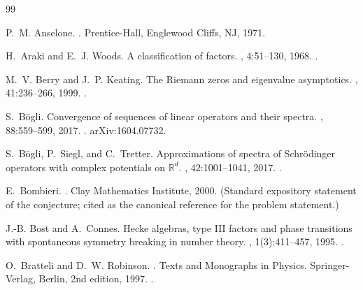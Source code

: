 %

\begin{thebibliography}{99}


P.~M. Anselone.
.
\newblock Prentice-Hall, Englewood Cliffs, NJ, 1971.

H.~Araki and E.~J. Woods.
\newblock A classification of factors.
, 4:51--130, 1968.
\newblock {}.


M.~V. Berry and J.~P. Keating.
\newblock The {R}iemann zeros and eigenvalue asymptotics.
, 41:236--266, 1999.
\newblock {}.

S.~B{\"o}gli.
\newblock Convergence of sequences of linear operators and their spectra.
, 88:559--599, 2017.
\newblock {}.
\newblock arXiv:1604.07732.

S.~B{\"o}gli, P.~Siegl, and C.~Tretter.
\newblock Approximations of spectra of {S}chr{\"o}dinger operators with complex
  potentials on $\mathbb{R}^d$.
, 42:1001--1041, 2017.
\newblock {}.

E.~Bombieri.
.
\newblock Clay Mathematics Institute, 2000.
\newblock (Standard expository statement of the conjecture; cited as the
  canonical reference for the problem statement.)

J.-B. Bost and A.~Connes.
\newblock Hecke algebras, type {III} factors and phase transitions with
  spontaneous symmetry breaking in number theory.
, 1(3):411--457, 1995.
\newblock {}.

O.~Bratteli and D.~W. Robinson.
.
\newblock Texts and Monographs in Physics. Springer-Verlag, Berlin, 2nd
  edition, 1997.
\newblock {}.


\end{thebibliography}
